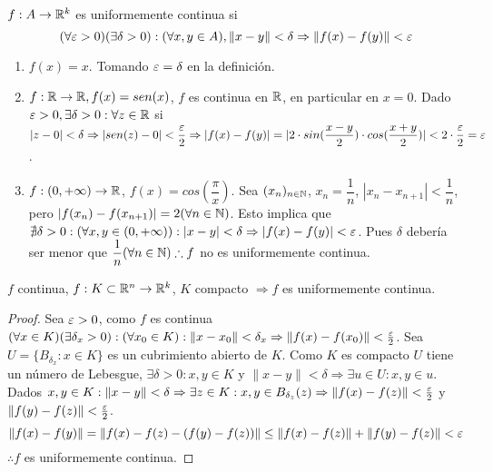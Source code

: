\begin{definition}
  $f: A \to \mathbb{R}^k$ es uniformemente continua si \begin{equation}
    (\forall \varepsilon > 0)(\exists \delta > 0) : (\forall x,y \in A), \|x-y\| < \delta \Rightarrow \|f(x) - f(y)\| < \varepsilon
  \end{equation}
\end{definition}

\begin{eg}
  \begin{enumerate}
    \item $f(x) = x$. Tomando $\varepsilon = \delta$ en la definición.
    \item $f: \mathbb{R} \to \mathbb{R}, f(x) = sen(x)$, $f$ es continua en $\mathbb{R}$, en particular en $x = 0$. Dado $\varepsilon > 0, \exists \delta > 0 : \forall z \in \mathbb{R}$ si $|z-0| < \delta \Rightarrow |sen(z) - 0| < \dfrac{\varepsilon}{2} \Rightarrow |f(x) - f(y)| = |2 \cdot sin(\dfrac{x-y}{2}) \cdot cos(\dfrac{x+y}{2})| < 2 \cdot \dfrac{\varepsilon}{2} = \varepsilon$.
    \item $f: (0, +\infty) \to \mathbb{R}$, $f(x) = cos(\dfrac{\pi}{x})$. Sea $(x_n)_{n \in \mathbb{N}}$, $x_n = \dfrac{1}{n}$, $|x_n - x_{n+1}| < \dfrac{1}{n}$, pero $|f(x_n) - f(x_{n+1})| = 2 (\forall n \in \mathbb{N})$. Esto implica que $\nexists \delta > 0 : (\forall x,y \in (0, +\infty)) : |x-y| < \delta \Rightarrow |f(x) - f(y)| < \varepsilon$. Pues $\delta$ debería ser menor que $\dfrac{1}{n} (\forall n \in \mathbb{N}) \therefore f$ no es uniformemente continua.
  \end{enumerate}
\end{eg}

\begin{theorem}
  $f$ continua, $f: K \subset \mathbb{R}^n \to \mathbb{R}^k$, $K$ compacto $\Rightarrow f$ es uniformemente continua.
  \begin{proof}
    Sea $\varepsilon > 0$, como $f$ es continua $(\forall x \in K)(\exists \delta_x > 0) : (\forall x_0 \in K) : \|x - x_0\| < \delta_x \Rightarrow \|f(x) - f(x_0)\| < \frac{\varepsilon}{2}$. Sea $U = \{B_{\delta_x} : x \in K\}$ es un cubrimiento abierto de $K$. Como $K$ es compacto $U$ tiene un número de Lebesgue, $\exists \delta > 0 : x, y \in K$ y $ \|x-y\| < \delta \Rightarrow \exists u \in U : x, y \in u$. Dados $x, y \in K : \|x-y\| < \delta \Rightarrow \exists z \in K : x, y \in B_{\delta_z}(z) \Rightarrow \|f(x) - f(z)\| < \frac{\varepsilon}{2}$ y $\|f(y) - f(z)\| < \frac{\varepsilon}{2}$.
    \begin{equation}
      \|f(x) - f(y)\| = \|f(x) - f(z) - (f(y) - f(z))\| \leq \|f(x) - f(z)\| + \|f(y) - f(z)\| < \varepsilon
    \end{equation} $\therefore f$ es uniformemente continua.
  \end{proof}
\end{theorem}

